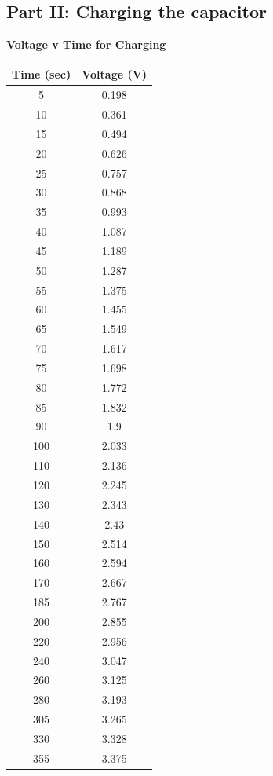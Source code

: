 \documentclass[titlepage]{article}
\begin{document}
	\subsection{Part II: Charging the capacitor } 
	\begin{minipage}[h]{0.5\textwidth}
		\textbf{Voltage v Time for Charging}
		\vspace{1cm}
		\centering
		\begin{tabular}{c|c}
			Time (sec) & Voltage (V) \\
			\hline
			5   & 0.198  \\
			10  & 0.361  \\
			15  & 0.494  \\
			20  & 0.626  \\
			25  & 0.757  \\
			30  & 0.868  \\
			35  & 0.993  \\
			40  & 1.087  \\
			45  & 1.189  \\
			50  & 1.287  \\
			55  & 1.375  \\
			60  & 1.455  \\
			65  & 1.549  \\
			70  & 1.617  \\
			75  & 1.698  \\
			80  & 1.772  \\
			85  & 1.832  \\
			90  & 1.9    \\
			100 & 2.033  \\
			110 & 2.136  \\
			120 & 2.245  \\
			130 & 2.343  \\
			140 & 2.43   \\
			150 & 2.514  \\
			160 & 2.594  \\
			170 & 2.667  \\
			185 & 2.767  \\
			200 & 2.855  \\
			220 & 2.956  \\
			240 & 3.047  \\
			260 & 3.125  \\
			280 & 3.193  \\
			305 & 3.265  \\
			330 & 3.328  \\
			355 & 3.375  \\

\end{tabular}
\end{minipage}
\end{document}
